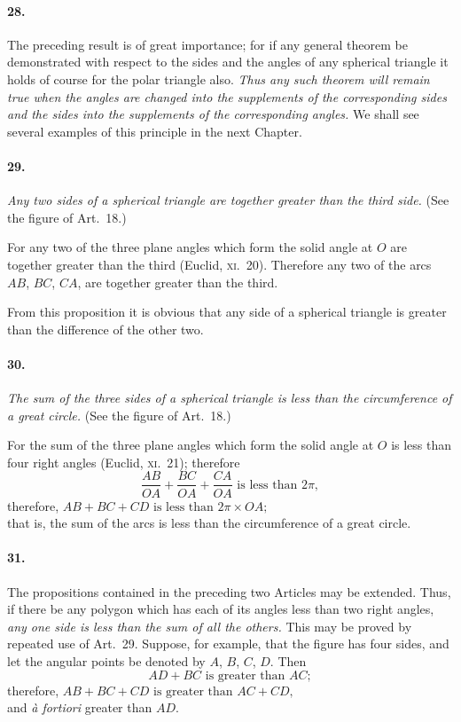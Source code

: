 \documentclass{book}[2004/02/16]
\begin{document}
\begin{mainmatter}
\begin{spacing}{1.3}
\paragraph{28.} The preceding result is of great importance; for if any
general theorem be demonstrated with respect to the sides and the
angles of any spherical triangle it holds of course for the polar
triangle also. \textit{Thus any such theorem will remain true when the
angles are changed into the supplements of the corresponding sides
and the sides into the supplements of the corresponding angles.} We
shall see several examples of this principle in the next Chapter.

\paragraph{29.} \textit{Any two sides of a spherical triangle are together greater
than the third side.} (See the figure of Art.\ 18.)

For any two of the three plane angles which form the solid
angle at $O$ are together greater than the third (Euclid, \textsc{xi}.\ 20).
Therefore any two of the arcs $AB$, $BC$, $CA$, are together greater
than the third.

From this proposition it is obvious that any side of a spherical
triangle is greater than the difference of the other two.

\paragraph{30.} \textit{The sum of the three sides of a spherical triangle is less than
the circumference of a great circle.} (See the figure of Art.\ 18.)

For the sum of the three plane angles which form the solid
angle at $O$ is less than four right angles (Euclid, \textsc{xi.}~21); therefore
\[
\dfrac{AB}{OA} + \dfrac{BC}{OA} + \dfrac{CA}{OA} \text{ is less than } 2\pi,
\]
therefore,\hfill
$\displaystyle AB+BC+CD \text{ is less than } 2\pi\times OA;$\hfill{}\\
that is, the sum of the arcs is less than the circumference of a
great circle.

\paragraph{31.} The propositions contained in the preceding two Articles
may be extended. Thus, if there be any polygon which has each
of its angles less than two right angles, \textit{any one side is less than the
sum of all the others.} This may be proved by repeated use of
Art.~29. Suppose, for example, that the figure has four sides, and
let the angular points be denoted by $A$, $B$, $C$, $D$. Then
\[
AD+BC\text{ is greater than }AC;
\]
therefore,\hfill
$\displaystyle AB+BC+CD \text{ is greater than } AC+CD,$\hfill{}\\
and \textit{{\`a} fortiori} greater than $AD$.


\end{spacing}
\end{mainmatter}
\end{document}
